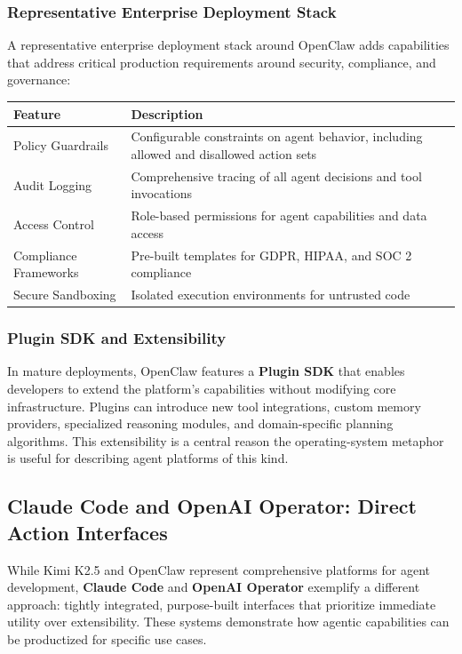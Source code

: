 \subsubsection{Representative Enterprise Deployment Stack}

A representative enterprise deployment stack around OpenClaw adds capabilities that address critical production requirements around security, compliance, and governance:

\begin{table}[tbp]
\centering
\footnotesize
\begin{tabularx}{\textwidth}{YY}
\toprule
\textbf{Feature} & \textbf{Description} \\
\midrule
Policy Guardrails & Configurable constraints on agent behavior, including allowed and disallowed action sets \\
Audit Logging & Comprehensive tracing of all agent decisions and tool invocations \\
Access Control & Role-based permissions for agent capabilities and data access \\
Compliance Frameworks & Pre-built templates for GDPR, HIPAA, and SOC 2 compliance \\
Secure Sandboxing & Isolated execution environments for untrusted code \\
\bottomrule
\end{tabularx}
\end{table}

\subsubsection{Plugin SDK and Extensibility}

In mature deployments, OpenClaw features a \textbf{Plugin SDK} that enables developers to extend the platform's capabilities without modifying core infrastructure. Plugins can introduce new tool integrations, custom memory providers, specialized reasoning modules, and domain-specific planning algorithms. This extensibility is a central reason the operating-system metaphor is useful for describing agent platforms of this kind.

\subsection{Claude Code and OpenAI Operator: Direct Action Interfaces}

While Kimi K2.5 and OpenClaw represent comprehensive platforms for agent development, \textbf{Claude Code} and \textbf{OpenAI Operator} exemplify a different approach: tightly integrated, purpose-built interfaces that prioritize immediate utility over extensibility. These systems demonstrate how agentic capabilities can be productized for specific use cases.

